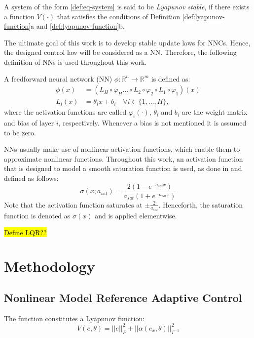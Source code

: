    \begin{definition}
       A system of the form \eqref{def:eq-system} is said to be \textit{Lyapunov stable}, if there exists a function $V(\cdot)$ that satisfies the conditions of Definition \ref{def:lyapunov-function}a and \ref{def:lyapunov-function}b.
       \label{def:lyapunov-stability}
   \end{definition}
   
   The ultimate goal of this work is to develop stable update laws for NNCs. Hence, the designed control law will be considered as a NN. Therefore, the following definition of NNs is used throughout this work.
   
   \begin{definition}
    A feedforward neural network (NN) $\phi:\mathbb{R}^n\rightarrow \mathbb{R}^m$ is defined as:
   \begin{equation}
    \begin{aligned}
    \phi (x) & = (L_{H} \circ \varphi_{H} \dots \circ L_{2} \circ \varphi_{2} \circ L_{1} \circ \varphi_1)(x)\\
    L_i(x) &= \theta_i x + b_i \quad \forall i\in\{1,..., H\},
   \end{aligned}
   \end{equation}
    where the activation functions are called $\varphi_i(\cdot)$, $\theta_i$ and $b_i$ are the weight matrix and bias of layer $i$, respectively. Whenever a bias is not mentioned it is assumed to be zero.
\end{definition}

NNs usually make use of nonlinear activation functions, which enable them to approximate nonlinear functions. Throughout this work, an activation function that is designed to model a smooth saturation function is used, as done in \cite{wahby_enhanced_2024} and defined as follows:
\begin{equation}
 \sigma (x;a_{sat}) = \frac{2(1-e^{-a_{sat}x})}{a_{sat}(1+e^{-a_{sat}x})}
 \label{eq:sigmoid}
\end{equation}
Note that the activation function saturates at $\pm \frac{2}{a_{sat}}$. Henceforth, the saturation function is denoted as $\sigma(x)$ and is applied elementwise.

\hl{Define LQR??}


\section{Methodology}
\subsection{Nonlinear Model Reference Adaptive Control}
\begin{theorem}
    The function constitutes a Lyapunov function:
    \begin{equation}
    V(e,\theta) = ||e||_P^2 + ||\alpha(e_x,\theta)||_{\Gamma^{-1}}^2
    \end{equation}

\end{theorem}



